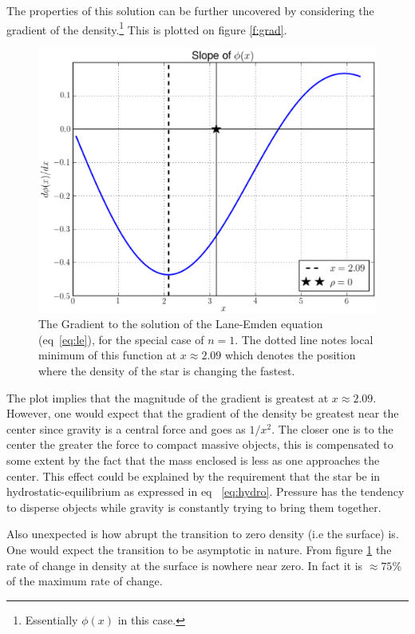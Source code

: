 \documentclass[12pt, manuscript]{article}
\begin{document}
\noindent The properties of this solution can be further uncovered by considering the gradient of the density.\footnote{Essentially $\phi(x)$ in this case.} This is plotted on figure \eqref{f:grad}.

\begin{figure}[h]
  \begin{center}
      \includegraphics[scale=0.7]{images/SlopePhi.eps}
  \caption{The Gradient to the solution of the Lane-Emden equation (eq~\eqref{eq:le}), for the special case of $n=1$. The dotted line notes local minimum of this function at $x\approx2.09$ which denotes the position where the density of the star is changing the fastest.}\label{f:grad}
  \end{center}
  \end{figure}
\noindent The plot implies that the magnitude of the  gradient is greatest at $x\approx 2.09$. However, one would expect that the gradient of the density be greatest near the center since gravity is a central force and goes as $1/x^{2}$. The closer one is to the center the greater the force to compact massive objects, this is compensated to some extent by the fact that the mass enclosed is less as one approaches the center. This effect could be explained by the requirement that the star be in hydrostatic-equilibrium as expressed in eq~ \eqref{eq:hydro}. Pressure has the tendency to disperse objects while gravity is constantly trying to bring them together. \par

\noindent Also unexpected is how abrupt the transition to zero density (i.e the surface) is. One would expect the transition to be asymptotic in nature. From figure \ref{f:grad} the rate of change in density at the surface is nowhere near zero. In fact it is $\approx75$\% of the maximum rate of change.\par
\end{document}
